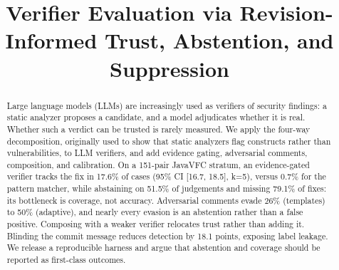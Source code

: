 \documentclass[conference]{IEEEtran}
\begin{document}
\title{Verifier Evaluation via Revision-Informed Trust, Abstention, and Suppression}
\author{%
\and
{}
\and
{}
\and
{}
\and
{}
}
\maketitle

\begin{abstract}
Large language models (LLMs) are increasingly used as verifiers of security findings: a static analyzer proposes a candidate, and a model adjudicates whether it is real. Whether such a verdict can be trusted is rarely measured. We apply the four-way decomposition, originally used to show that static analyzers flag constructs rather than vulnerabilities, to LLM verifiers, and add evidence gating, adversarial comments, composition, and calibration. On a 151-pair JavaVFC stratum, an evidence-gated verifier tracks the fix in 17.6\% of cases (95\% CI [16.7, 18.5], k=5), versus 0.7\% for the pattern matcher, while abstaining on 51.5\% of judgements and missing 79.1\% of fixes: its bottleneck is coverage, not accuracy. Adversarial comments evade 26\% (templates) to 50\% (adaptive), and nearly every evasion is an abstention rather than a false positive. Composing with a weaker verifier relocates trust rather than adding it. Blinding the commit message reduces detection by 18.1 points, exposing label leakage. We release a reproducible harness and argue that abstention and coverage should be reported as first-class outcomes.
\end{abstract}
\end{document}
